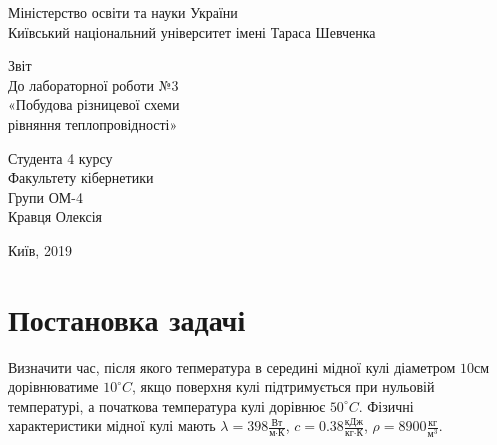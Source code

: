 \documentclass[14pt,a4paper]{scrartcl}
\begin{document}
	\begin{titlepage}
		\begin{center}
			\small{Міністерство освіти та науки України}\\
			\small{Київський національний університет імені Тараса Шевченка}\\
		\end{center}
			\vspace{15em}
		\begin{center}
			\large{Звіт}\\
			\large{До лабораторної роботи №3}\\
			\large{«Побудова різницевої схеми}\\
			\large{рівняння теплопровідності»}\\
		\end{center}
			
		\vspace{10em}
		

	
		\begin{flushright}
			Студента 4 курсу\\
			Факультету кібернетики\\
			Групи ОМ-4\\
			Кравця Олексія\\
			
		\end{flushright}
		
		\vspace{\fill}

		
		\begin{center}
			\small{Київ, 2019}
		\end{center}
	
	\end{titlepage}


	\newpage


\section{Постановка задачі}

Визначити час, після якого тепмература в середині мідної кулі діаметром $10 \text{см}$ дорівнюватиме $10 ^\circ C$, якщо поверхня кулі підтримується при нульовій температурі, а початкова температура кулі дорівнює $50 ^\circ C$. Фізичні характеристики мідної кулі мають $\lambda = 398 \frac{\text{Вт}}{\text{м}\cdot \text{К}}$, $c = 0.38 \frac{\text{кДж}}{\text{кг} \cdot \text{К}}$, $\rho = 8900 \frac{\text{кг}}{\text{м}^3}$.
\end{document}
